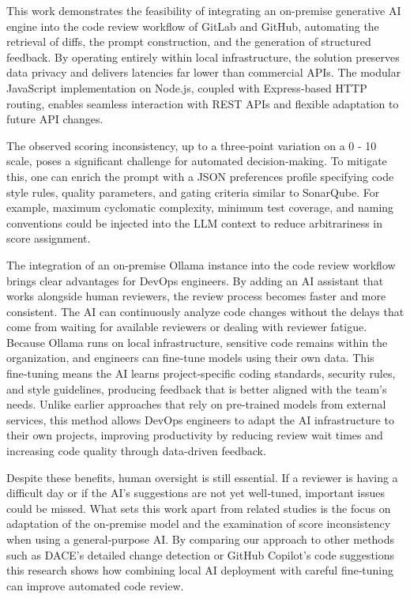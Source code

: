 \documentclass[12pt]{article}
\begin{document}
This work demonstrates the feasibility of integrating an on-premise generative AI engine into the code review workflow of GitLab and GitHub, automating the retrieval of diffs, the prompt construction, and the generation of structured feedback. By operating entirely within local infrastructure, the solution preserves data privacy and delivers latencies far lower than commercial APIs. The modular JavaScript implementation on Node.js, coupled with Express-based HTTP routing, enables seamless interaction with REST APIs and flexible adaptation to future API changes.

The observed scoring inconsistency, up to a three‑point variation on a 0 - 10 scale, poses a significant challenge for automated decision‑making. To mitigate this, one can enrich the prompt with a JSON preferences profile specifying code style rules, quality parameters, and gating criteria similar to SonarQube. For example, maximum cyclomatic complexity, minimum test coverage, and naming conventions could be injected into the LLM context to reduce arbitrariness in score assignment.

The integration of an on-premise Ollama instance into the code review workflow brings clear advantages for DevOps engineers. By adding an AI assistant that works alongside human reviewers, the review process becomes faster and more consistent. The AI can continuously analyze code changes without the delays that come from waiting for available reviewers or dealing with reviewer fatigue. Because Ollama runs on local infrastructure, sensitive code remains within the organization, and engineers can fine‑tune models using their own data. This fine‑tuning means the AI learns project‑specific coding standards, security rules, and style guidelines, producing feedback that is better aligned with the team's needs. Unlike earlier approaches that rely on pre‑trained models from external services, this method allows DevOps engineers to adapt the AI infrastructure to their own projects, improving productivity by reducing review wait times and increasing code quality through data-driven feedback.

Despite these benefits, human oversight is still essential. If a reviewer is having a difficult day or if the AI's suggestions are not yet well‑tuned, important issues could be missed. What sets this work apart from related studies is the focus on adaptation of the on-premise model and the examination of score inconsistency when using a general‑purpose AI. By comparing our approach to other methods such as DACE's detailed change detection or GitHub Copilot's code suggestions this research shows how combining local AI deployment with careful fine‑tuning can improve automated code review.
\end{document}
